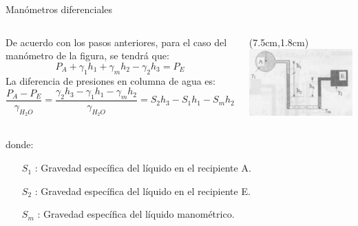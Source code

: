 \documentclass [xcolor=svgnames, t] {beamer}
\begin{document}
\begin{frame}{Man\'ometros diferenciales}
\begin{columns}
De acuerdo con los pasos anteriores, para el caso del man\'ometro de la figura, se tendr\'a que:
$$
P_A + \gamma_1 h_1 + \gamma_m h_2 - \gamma_2 h_3 = P_E
$$
La diferencia de presiones en columna de agua es:
$$
\frac{P_A - P_E}{\gamma_{H_2 O}} = \frac{\gamma_2 h_3 - \gamma_1 h_1 - \gamma_m h_2}{\gamma_{H_2 O}} = S_2 h_3 - S_1 h_1 - S_m h_2
$$
\begin{textblock*}{5.0cm}(7.5cm,1.8cm) %
\includegraphics[width=\textwidth]{manome2}
\end{textblock*}
\end{columns}
\vspace{0.5cm}
donde:
\begin{itemize}
\item[$S_1$]: Gravedad espec\'ifica del l\'iquido en el recipiente A.
\item[$S_2$]: Gravedad espec\'ifica del l\'iquido en el recipiente E.
\item[$S_m$]: Gravedad espec\'ifica del l\'iquido manom\'etrico.
\end{itemize}
\end{frame}
\end{document}
